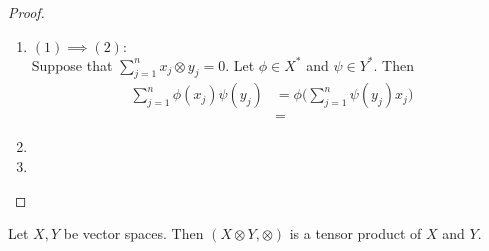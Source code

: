 \documentclass{book}
\begin{document}
\begin{proof}\
	\begin{enumerate}
		\item $(1) \implies (2):$ \\
		Suppose that $\sum\limits_{j=1}^n x_j \otimes y_j = 0$. Let $\phi \in X^*$ and $\psi \in Y^*$. Then 
		\begin{align*}
			\sum\limits_{j=1}^n  \phi(x_j) \psi(y_j)
			& = \phi \bigg( \sum\limits_{j=1}^n \psi(y_j) x_j \bigg) \\
			& = 
		\end{align*}
		\item 
		\item 
	\end{enumerate}
\end{proof}

\begin{ex}
	Let $X, Y$ be vector spaces. Then $(X \otimes Y, \otimes)$ is a tensor product of $X$ and $Y$. 
\end{ex}
\end{document}
